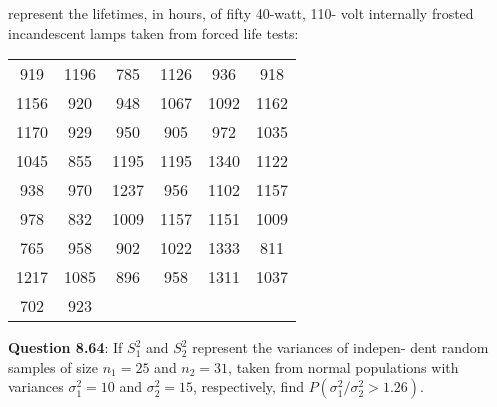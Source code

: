 \documentclass{article}
\begin{document}
    represent the lifetimes, in hours, of fifty 40-watt, 110-
    volt internally frosted incandescent lamps taken from
    forced life tests:
        \begin{center}
            \begin{tabular}{c c c c c c}
                919 & 1196 & 785 & 1126 & 936 & 918 \\
                1156 & 920 & 948 & 1067 & 1092 & 1162 \\
                1170 & 929 & 950 & 905 & 972 & 1035 \\
                1045 & 855 & 1195 & 1195 & 1340 & 1122 \\
                938 & 970 & 1237 & 956  & 1102 & 1157 \\
                978 & 832 & 1009 & 1157 & 1151 & 1009 \\
                765 & 958 & 902 & 1022 & 1333 & 811 \\ 
                1217 & 1085 & 896 & 958 & 1311 & 1037 \\
                702 & 923
            \end{tabular}
        \end{center}
    \textbf{Question 8.64}: If $S^2_1$ and $S_2^2$ represent the variances of indepen-
    dent random samples of size $n_1 = 25$ and $n_2 = 31$,
    taken from normal populations with variances $\sigma^2_1 = 10$
    and $\sigma_2^2 = 15$, respectively, find $P(\sigma^2_1 / \sigma_2^2 > 1.26)$.
\end{document}
